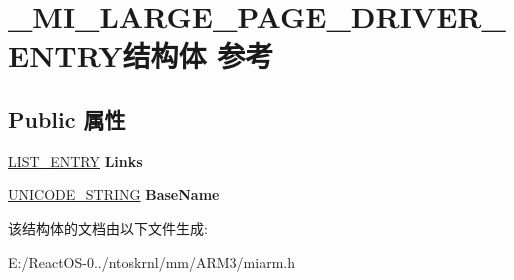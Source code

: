 \hypertarget{struct___m_i___l_a_r_g_e___p_a_g_e___d_r_i_v_e_r___e_n_t_r_y}{}\section{\+\_\+\+M\+I\+\_\+\+L\+A\+R\+G\+E\+\_\+\+P\+A\+G\+E\+\_\+\+D\+R\+I\+V\+E\+R\+\_\+\+E\+N\+T\+R\+Y结构体 参考}
\label{struct___m_i___l_a_r_g_e___p_a_g_e___d_r_i_v_e_r___e_n_t_r_y}
\subsection*{Public 属性}
\begin{DoxyCompactItemize}
\item 
\mbox{\label{struct___m_i___l_a_r_g_e___p_a_g_e___d_r_i_v_e_r___e_n_t_r_y_a8362ed156806d1e04a8baefaeb30d8b4}} 
\hyperlink{struct___l_i_s_t___e_n_t_r_y}{L\+I\+S\+T\+\_\+\+E\+N\+T\+RY} {\bfseries Links}
\item 
\mbox{\label{struct___m_i___l_a_r_g_e___p_a_g_e___d_r_i_v_e_r___e_n_t_r_y_acfce216703d852c56b8aae3adcc4d7fa}} 
\hyperlink{struct___u_n_i_c_o_d_e___s_t_r_i_n_g}{U\+N\+I\+C\+O\+D\+E\+\_\+\+S\+T\+R\+I\+NG} {\bfseries Base\+Name}
\end{DoxyCompactItemize}


该结构体的文档由以下文件生成\+:\begin{DoxyCompactItemize}
\item 
E\+:/\+React\+O\+S-\/0../ntoskrnl/mm/\+A\+R\+M3/miarm.\+h\end{DoxyCompactItemize}
